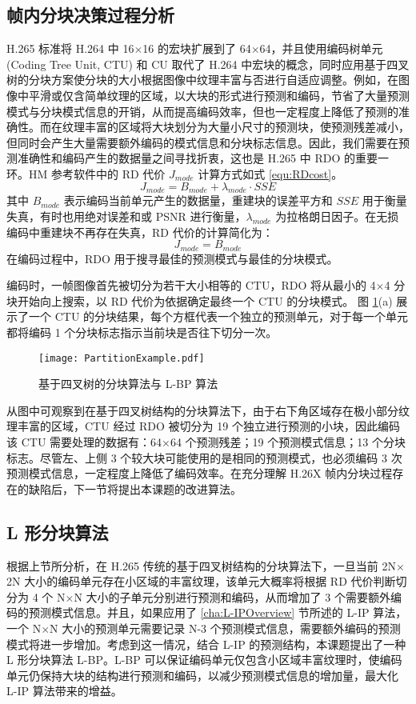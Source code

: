 \subsection{帧内分块决策过程分析}
H.265 标准将 H.264 中 16$\times$16 的宏块扩展到了 64$\times$64，并且使用编码树单元 (Coding Tree Unit, CTU) 和 CU 取代了 H.264 中宏块的概念，同时应用基于四叉树的分块方案使分块的大小根据图像中纹理丰富与否进行自适应调整。例如，在图像中平滑或仅含简单纹理的区域，以大块的形式进行预测和编码，节省了大量预测模式与分块模式信息的开销，从而提高编码效率，但也一定程度上降低了预测的准确性。而在纹理丰富的区域将大块划分为大量小尺寸的预测块，使预测残差减小，但同时会产生大量需要额外编码的模式信息和分块标志信息。因此，我们需要在预测准确性和编码产生的数据量之间寻找折衷，这也是 H.265 中 RDO 的重要一环。HM 参考软件中的 RD 代价 $J_{mode}$ 计算方式如式 \ref{equ:RDcost}。
\begin{equation}
    J_{mode}=B_{mode}+\lambda_{mode}\cdot SSE
    \label{equ:RDcost}
\end{equation}
其中 $B_{mode}$ 表示编码当前单元产生的数据量，重建块的误差平方和 $SSE$ 用于衡量失真，有时也用绝对误差和或 PSNR 进行衡量，$\lambda_{mode}$ 为拉格朗日因子。在无损编码中重建块不再存在失真，RD 代价的计算简化为：
\begin{equation}
    J_{mode}=B_{mode}
\end{equation}
在编码过程中，RDO 用于搜寻最佳的预测模式与最佳的分块模式。

编码时，一帧图像首先被切分为若干大小相等的 CTU，RDO 将从最小的 4$\times$4 分块开始向上搜索，以 RD 代价为依据确定最终一个 CTU 的分块模式。
图 \ref{fig:PartitionExample}(a) 展示了一个 CTU 的分块结果，每个方框代表一个独立的预测单元，对于每一个单元都将编码 1 个分块标志指示当前块是否往下切分一次。
\begin{figure}[hbt]
    \centering
    \texttt{[image: PartitionExample.pdf]}
    \caption{基于四叉树的分块算法与 L-BP 算法}
    \label{fig:PartitionExample}
\end{figure}
从图中可观察到在基于四叉树结构的分块算法下，由于右下角区域存在极小部分纹理丰富的区域，CTU 经过 RDO 被切分为 19 个独立进行预测的小块，因此编码该 CTU 需要处理的数据有：64$\times$64 个预测残差；19 个预测模式信息；13 个分块标志。尽管左、上侧 3 个较大块可能使用的是相同的预测模式，也必须编码 3 次预测模式信息，一定程度上降低了编码效率。在充分理解 H.26X 帧内分块过程存在的缺陷后，下一节将提出本课题的改进算法。

\subsection{L 形分块算法}
根据上节所分析，在 H.265 传统的基于四叉树结构的分块算法下，一旦当前 2N$\times$2N 大小的编码单元存在小区域的丰富纹理，该单元大概率将根据 RD 代价判断切分为 4 个 N$\times$N 大小的子单元分别进行预测和编码，从而增加了 3 个需要额外编码的预测模式信息。并且，如果应用了 \ref{cha:L-IPOverview} 节所述的 L-IP 算法，一个 N$\times$N 大小的预测单元需要记录 N-3 个预测模式信息，需要额外编码的预测模式将进一步增加。考虑到这一情况，结合 L-IP 的预测结构，本课题提出了一种 L 形分块算法 L-BP。L-BP 可以保证编码单元仅包含小区域丰富纹理时，使编码单元仍保持大块的结构进行预测和编码，以减少预测模式信息的增加量，最大化 L-IP 算法带来的增益。

